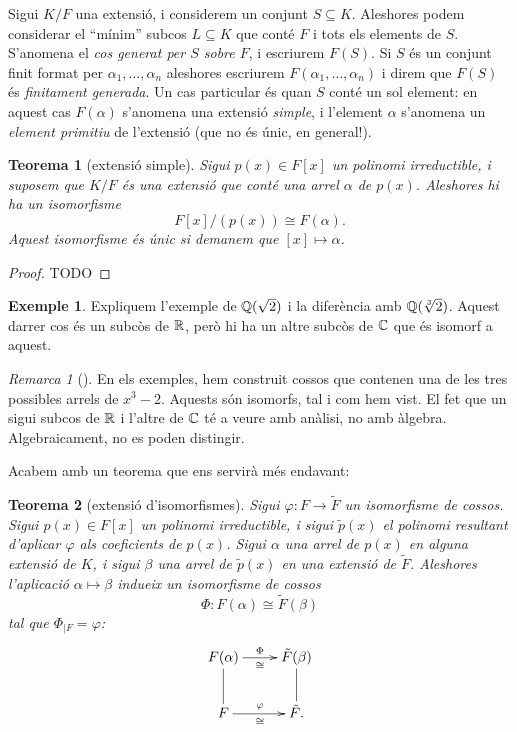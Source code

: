 \documentclass[
]{book}
\newtheorem{theorem}{Teorema}[chapter]
\theoremstyle{definition}
\theoremstyle{definition}
\newtheorem{example}{Exemple}[chapter]
\theoremstyle{definition}
\theoremstyle{definition}
\theoremstyle{remark}
\newtheorem*{remark}{Remarca}
\begin{document}
Sigui \(K/F\) una extensió, i considerem un conjunt \(S\subseteq K\). Aleshores podem considerar el ``mínim'' subcos \(L\subseteq K\)
que conté \(F\) i tots els elements de \(S\). S'anomena el \emph{cos generat per \(S\) sobre \(F\)}, i escriurem \(F(S)\). Si \(S\) és un
conjunt finit format per \(\alpha_1,\ldots,\alpha_n\) aleshores escriurem \(F(\alpha_1,\ldots,\alpha_n)\) i direm que \(F(S)\) és \emph{finitament generada}. Un cas particular
és quan \(S\) conté un sol element: en aquest cas \(F(\alpha)\) s'anomena una extensió \emph{simple}, i l'element \(\alpha\) s'anomena
un \emph{element primitiu} de l'extensió (que no és únic, en general!).

\begin{theorem}[extensió simple]
\protect\hypertarget{thm:ext-simple}{}\label{thm:ext-simple}Sigui \(p(x)\in F[x]\) un polinomi irreductible, i suposem que \(K/F\) és una extensió que conté una arrel \(\alpha\) de \(p(x)\).
Aleshores hi ha un isomorfisme \[F[x]/(p(x))\cong F(\alpha).\]
Aquest isomorfisme és únic si demanem que \([x]\mapsto \alpha\).
\end{theorem}

\begin{proof}
TODO
\end{proof}

\begin{example}
Expliquem l'exemple de \(\mathbb{Q}(\sqrt{2})\) i la diferència amb \(\mathbb{Q}(\sqrt[3]{2})\). Aquest darrer cos és un subcòs de \(\mathbb{R}\), però hi ha
un altre subcòs de \(\mathbb{C}\) que és isomorf a aquest.
\end{example}

\begin{remark}[]
En els exemples, hem construit cossos que contenen una de les tres possibles arrels de \(x^3-2\). Aquests són isomorfs, tal
i com hem vist. El fet que un sigui subcos de \(\mathbb{R}\) i l'altre de \(\mathbb{C}\) té a veure amb anàlisi, no amb àlgebra. Algebraicament,
no es poden distingir.
\end{remark}

Acabem amb un teorema que ens servirà més endavant:

\begin{theorem}[extensió d'isomorfismes]
Sigui \(\varphi\colon F\to \tilde F\) un isomorfisme de cossos. Sigui \(p(x)\in F[x]\) un polinomi irreductible,
i sigui \(\tilde p(x)\) el polinomi resultant d'aplicar \(\varphi\) als coeficients de \(p(x)\). Sigui \(\alpha\) una
arrel de \(p(x)\) en alguna extensió de \(K\), i sigui \(\beta\) una arrel de \(\tilde p(x)\) en una extensió de \(\tilde F\).
Aleshores l'aplicació \(\alpha\mapsto \beta\) indueix un isomorfisme de cossos
\[
\Phi\colon F(\alpha) \cong \tilde F(\beta)
\]
tal que \(\Phi_{| F} = \varphi\):
\[
\begin{xy}
\xymatrix{
  F(\alpha)\ar_{\cong}^{\Phi}[r]\ar@{-}[d] & \tilde F(\beta)\ar@{-}[d]\\
  F \ar_{\cong}^{\varphi}[r] & \tilde F.
}
\end{xy}
\]
\end{theorem}
\end{document}
